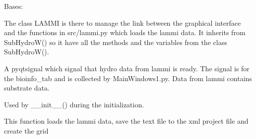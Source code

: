 \documentclass[letterpaper,10pt,english]{sphinxmanual}
\begin{document}

\begin{fulllineitems}
\label{\detokenize{index:src_GUI.hydro_GUI_2.LAMMI}}
Bases: {\hyperref[\detokenize{index:src_GUI.hydro_GUI_2.SubHydroW}]{}}

The class LAMMI is there to manage the link between the graphical interface and the functions in src/lammi.py
which loads the lammi data. It inherits from SubHydroW() so it have all the methods and the variables
from the class SubHydroW().

\begin{fulllineitems}
\label{\detokenize{index:src_GUI.hydro_GUI_2.LAMMI.drop_merge}}
A pyqtsignal which signal that hydro data from lammi is ready. The signal is for the bioinfo\_tab and is collected
by MainWindows1.py. Data from lammi contains substrate data.

\end{fulllineitems}


\begin{fulllineitems}
\label{\detokenize{index:src_GUI.hydro_GUI_2.LAMMI.init_iu}}
Used by \_\_init\_\_() during the initialization.

\end{fulllineitems}


\begin{fulllineitems}
\label{\detokenize{index:src_GUI.hydro_GUI_2.LAMMI.load_lammi_gui}}
This function loads the lammi data, save the text file to the xml project file and create the grid

\end{fulllineitems}



\end{fulllineitems}
\end{document}
